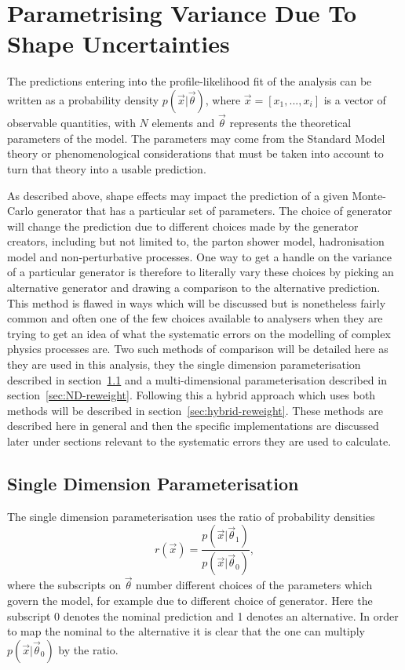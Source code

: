 \section{Parametrising Variance Due To Shape Uncertainties}
\label{sec:re-weighting}

The predictions entering into the profile-likelihood fit of the analysis can be
written as a probability density $p(\vec{x}|\vec{\theta})$, where $\vec{x} =
[x_{1},..., x_{i}]$ is a vector of observable quantities, with $N$ elements and
$\vec{\theta}$ represents the theoretical parameters of the model. The
parameters may come from the Standard Model theory or phenomenological
considerations that must be taken into account to turn that theory into a usable
prediction.

As described above, shape effects may impact the prediction of a given
Monte-Carlo generator that has a particular set of parameters. The choice of
generator will change the prediction due to different choices made by the
generator creators, including but not limited to, the parton shower model,
hadronisation model and non-perturbative processes. One way to get a handle on
the variance of a particular generator is therefore to literally vary these
choices by picking an alternative generator and drawing a comparison to the
alternative prediction. This method is flawed in ways which will be discussed
but is nonetheless fairly common and often one of the few choices available to
analysers when they are trying to get an idea of what the systematic errors on
the modelling of complex physics processes are. Two such methods of comparison
will be detailed here as they are used in this analysis, they the single
dimension parameterisation described in section~\ref{sec:1D-reweight} and a
multi-dimensional parameterisation described in section~\ref{sec:ND-reweight}.
Following this a hybrid approach which uses both methods will be described in
section~\ref{sec:hybrid-reweight}. These methods are described here in general
and then the specific implementations are discussed later under sections
relevant to the systematic errors they are used to calculate.

\subsection{Single Dimension Parameterisation}
\label{sec:1D-reweight}

The single dimension parameterisation uses the ratio of probability densities
\begin{equation}
  r(\vec{x}) = \frac{p(\vec{x}|\vec{\theta}_{1})}{p(\vec{x}|\vec{\theta}_{0})},
  \label{eq:DensityRatio}
\end{equation}
where the subscripts on $\vec{\theta}$ number different choices of the
parameters which govern the model, for example due to different choice of
generator. Here the subscript 0 denotes the nominal prediction and 1 denotes an
alternative. In order to map the nominal to the alternative it is clear that the
one can multiply $p(\vec{x}|\vec{\theta}_{0})$ by the ratio.

